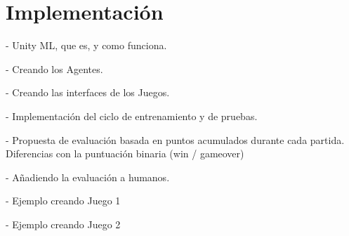 \chapter{Implementación}\label{chapter:implementation}

- Unity ML, que es, y como funciona.

- Creando los Agentes.

- Creando las interfaces de los Juegos.

- Implementación del ciclo de entrenamiento y de pruebas.

- Propuesta de evaluación basada en puntos acumulados durante cada partida. Diferencias con la puntuación binaria (win / gameover)

- Añadiendo la evaluación a humanos.

- Ejemplo creando Juego 1

- Ejemplo creando Juego 2
